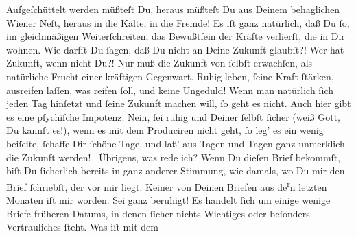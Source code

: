 \begin{ledgroupsized}[t]{13cm}
           \pstart
           Aufgeſchüttelt werden müßteſt Du, heraus müßteſt Du aus Deinem behaglichen Wiener Neſt, heraus in die Kälte, in die Fremde! Es
               iſt ganz natürlich, daß Du ſo, im gleichmäßigen {\pb}Weiterſchreiten, das Bewußtſein der Kräfte verlierſt, die in Dir wohnen.\pend
           \pstart
           Wie darfſt Du ſagen, daß Du nicht an Deine Zukunft glaubſt?! Wer hat Zukunft, wenn
               nicht Du?! Nur muß die Zukunft von ſelbſt erwachſen, als natürliche Frucht einer
               kräftigen Gegenwart. Ruhig leben, ſeine Kraft ſtärken, ausreifen laſſen, was reifen
               ſoll, und keine Ungeduld! Wenn man natürlich ſich jeden Tag hinſetzt und ſeine
               Zukunft machen will, ſo geht es nicht. Auch hier gibt es  eine pſychiſche Impotenz. Nein, ſei ruhig und Deiner ſelbſt ſicher (weiß Gott,
               Du kannſt es!), {\pb}wenn es mit  dem Produciren nicht geht, ſo leg’ es ein wenig
               beiſeite, ſchaffe Dir ſchöne Tage, und laß’ aus Tagen und Tagen ganz unmerklich die
               Zukunft werden! {\dotsfour}\pend
           \pstart
           Übrigens, was rede ich? Wenn Du dieſen Brief bekommſt, biſt Du ſicherlich bereits in
               ganz anderer Stimmung, wie damals, wo Du mir  den
               Brief ſchriebſt, der vor mir liegt.\pend
           \pstart
           Keiner von Deinen Briefen aus de\substVorne{}\textsuperscript{r}\substDazwischen{}n\substHinten{} letzten Monaten iſt mir \label{K_L02834-2v}\label{K_L02834-2h} worden. Sei ganz beruhigt! Es handelt ſich um einige wenige Briefe früheren
               Datums, in denen ſicher nichts Wichtiges oder beſonders Vertrauliches ſteht.\pend
           \pstart
           {\pb}Was iſt mit dem \label{K_L02834-3v}
\end{ledgroupsized}
